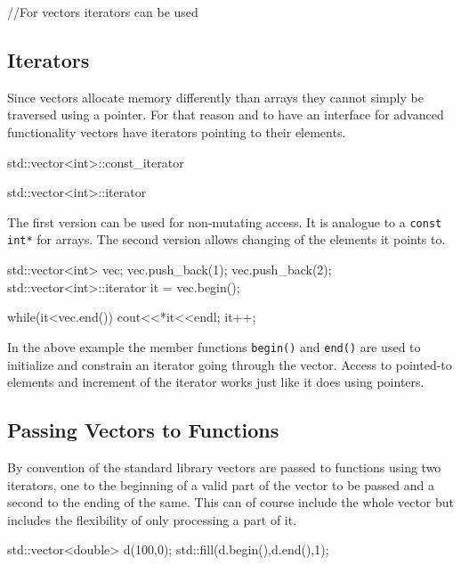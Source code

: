 \documentclass[10pt,a4paper]{scrartcl}
\begin{document}
\begin{multicols*}{2}
\begin{enumerate}
\begin{TPCpp}
//For vectors iterators can be used

\end{TPCpp}
\end{enumerate}

\subsection{Iterators}
\label{sec:Iterators}

Since vectors allocate memory differently than arrays they cannot simply be traversed using a pointer. For that reason and to have an interface for advanced functionality vectors have iterators pointing to their elements.

\begin{TPCpp}
std::vector<int>::const_iterator

std::vector<int>::iterator
\end{TPCpp}

The first version can be used for non-mutating access. It is analogue to a \verb+const int*+ for arrays. The second version allows changing of the elements it points to. 

\begin{TPCpp}
std::vector<int> vec;
vec.push_back(1);
vec.push_back(2);
std::vector<int>::iterator it = vec.begin();

while(it<vec.end()) {
	cout<<*it<<endl;
	it++;
}
\end{TPCpp}

In the above example the member functions \verb+begin()+ and \verb+end()+ are used to initialize and constrain an iterator going through the vector. Access to pointed-to elements and increment of the iterator works just like it does using pointers.

\subsection{Passing Vectors to Functions}
\label{sec:PassingVectorsToFunctions}

By convention of the standard library vectors are passed to functions using two iterators, one to the beginning of a valid part of the vector to be passed and  a second to the ending of the same. This can of course include the whole vector but includes the flexibility of only processing a part of it.

\begin{TPCpp}
std::vector<double> d(100,0);
std::fill(d.begin(),d.end(),1);
\end{TPCpp}


\end{multicols*}
\end{document}
